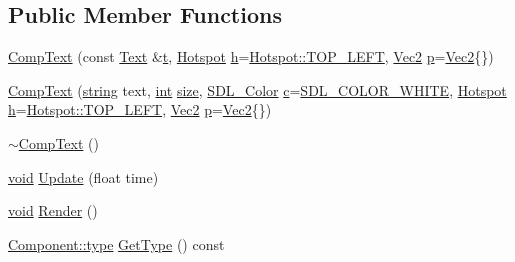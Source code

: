 \subsection*{Public Member Functions}
\begin{DoxyCompactItemize}
\item 
\hyperlink{class_comp_text_a4dda0bbb1f7059570a23eb91c9871465}{Comp\-Text} (const \hyperlink{class_text}{Text} \&\hyperlink{_s_d_l__opengl_8h_a7d65d00ca3b0630d9b5c52df855b19f5}{t}, \hyperlink{common_8hpp_aaa588ba8f99807e02a59c99df80af509}{Hotspot} \hyperlink{_s_d_l__opengl__glext_8h_afa0fb1b5e976920c0abeff2dca3ed774}{h}=\hyperlink{common_8hpp_aaa588ba8f99807e02a59c99df80af509a6b4ed010af97f067c8ba669e400f3f93}{Hotspot\-::\-T\-O\-P\-\_\-\-L\-E\-F\-T}, \hyperlink{class_vec2}{Vec2} \hyperlink{_s_d_l__opengl__glext_8h_aa5367c14d90f462230c2611b81b41d23}{p}=\hyperlink{class_vec2}{Vec2}\{\})
\item 
\hyperlink{class_comp_text_abdcc687e4cfc9b07859bbba77f7d833d}{Comp\-Text} (\hyperlink{_s_d_l__opengl__glext_8h_ae84541b4f3d8e1ea24ec0f466a8c568b}{string} text, \hyperlink{_s_d_l__thread_8h_a6a64f9be4433e4de6e2f2f548cf3c08e}{int} \hyperlink{_s_d_l__opengl__glext_8h_a3d1e3edfcf61ca2d831883e1afbad89e}{size}, \hyperlink{struct_s_d_l___color}{S\-D\-L\-\_\-\-Color} \hyperlink{_s_d_l__opengl__glext_8h_a1f2d7f8147412c43ba2303a56f97ee73}{c}=\hyperlink{common_8hpp_a8747c93cef1c9985be8fc426565f466e}{S\-D\-L\-\_\-\-C\-O\-L\-O\-R\-\_\-\-W\-H\-I\-T\-E}, \hyperlink{common_8hpp_aaa588ba8f99807e02a59c99df80af509}{Hotspot} \hyperlink{_s_d_l__opengl__glext_8h_afa0fb1b5e976920c0abeff2dca3ed774}{h}=\hyperlink{common_8hpp_aaa588ba8f99807e02a59c99df80af509a6b4ed010af97f067c8ba669e400f3f93}{Hotspot\-::\-T\-O\-P\-\_\-\-L\-E\-F\-T}, \hyperlink{class_vec2}{Vec2} \hyperlink{_s_d_l__opengl__glext_8h_aa5367c14d90f462230c2611b81b41d23}{p}=\hyperlink{class_vec2}{Vec2}\{\})
\item 
\hyperlink{class_comp_text_a12a92d6e53cf8640770604f8991eb1ca}{$\sim$\-Comp\-Text} ()
\item 
\hyperlink{_s_d_l__opengles2__gl2ext_8h_ae5d8fa23ad07c48bb609509eae494c95}{void} \hyperlink{class_comp_text_a7c77ec33b3fe74de7bb54906eac33faa}{Update} (float time)
\item 
\hyperlink{_s_d_l__opengles2__gl2ext_8h_ae5d8fa23ad07c48bb609509eae494c95}{void} \hyperlink{class_comp_text_ac546961e42fa2b51e63aa55e7415936d}{Render} ()
\item 
\hyperlink{class_component_ad6d161b6acf7b843b55bb9feac7af71a}{Component\-::type} \hyperlink{class_comp_text_a9ebc96605bb9c997ec65d5cda5075891}{Get\-Type} () const 
\end{DoxyCompactItemize}
